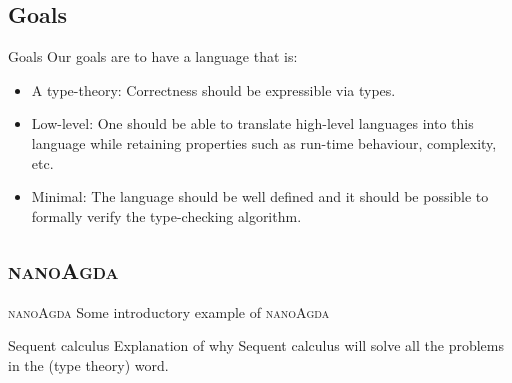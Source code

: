 \documentclass[xcolor=svgnames,11pt]{beamer}
\newcommand{\na}{\textsc{nanoAgda}\xspace}
\begin{document}
\subsection{Goals}
\begin{frame}{Goals}
  Our goals are to have a language that is:
  \begin{itemize}
  \item<1-> A type-theory: Correctness should be expressible via types.
  \item<2-> Low-level: One should be able to translate high-level languages into this language while retaining properties such as run-time behaviour, complexity, etc.
  \item<3-> Minimal: The language should be well defined and it should be possible to formally verify the type-checking algorithm.
  \end{itemize}
\end{frame}

\subsection{\na}
\begin{frame}{\na}
Some introductory example of \na
\end{frame}

\begin{frame}{Sequent calculus}
Explanation of why Sequent calculus will solve all the problems in the (type theory) word.
\end{frame}
\end{document}

